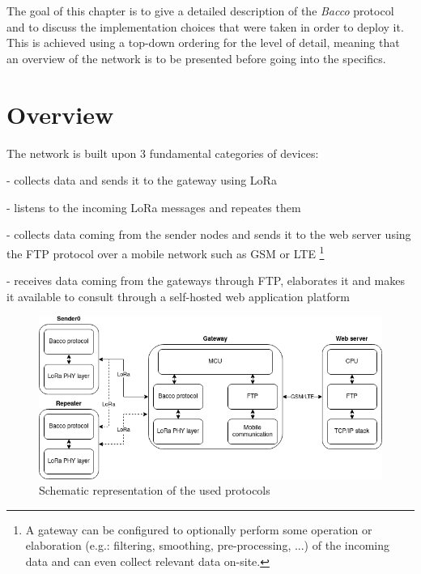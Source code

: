 The goal of this chapter is to give a detailed description of the \textit{Bacco} protocol and to discuss the
implementation choices that were taken in order to deploy it. This is achieved using a top-down ordering for the level
of detail, meaning that an overview of the network is to be presented before going into the specifics.

\section{Overview}
The network is built upon 3 fundamental categories of devices:

\begin{description}[font=$\bullet$~\normalfont\scshape\color{blue!50!black}]
    \item [Sender node] - collects data and sends it to the gateway using LoRa
    \item [Repeater node] - listens to the incoming LoRa messages and repeates them
    \item [Gateway node] - collects data coming from the sender nodes and sends it to the web server using the FTP
        protocol over a mobile network such as \gls{GSM} or \gls{LTE} \footnote{A gateway can be configured to optionally perform
        some operation or elaboration (e.g.: filtering, smoothing, pre-processing, ...) of the incoming data and can
    even collect relevant data on-site.}
    \item [Web server] - receives data coming from the gateways through FTP, elaborates it and makes it available to
        consult through a self-hosted web application platform
\end{description}

\begin{figure}[ht]
    \centering
    \includegraphics[width=1.0\textwidth]{uml/network_stack.png}
    \caption{Schematic representation of the used protocols}
    \label{network stack img}
\end{figure}

